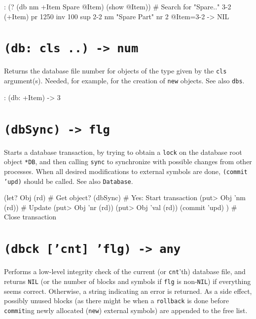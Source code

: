 {\begin{wideverbatim}
: (? (db nm +Item Spare @Item) (show @Item))  # Search for "Spare.."
{3-2} (+Item)
   pr 1250
   inv 100
   sup {2-2}
   nm "Spare Part"
   nr 2
 @Item={3-2}
-> NIL
\end{wideverbatim}

 
\section*{\texttt{(db: cls ..) -> num}}
\label{sec:func-ref-D-(db: cls ..) -> num}


Returns the database file number for objects of the type given by the
\texttt{cls} argument(s). Needed, for example, for the creation of \texttt{new}
objects. See also \texttt{dbs}.


\begin{wideverbatim}
: (db: +Item)
-> 3
\end{wideverbatim}

 
\section*{\texttt{(dbSync) -> flg}}
\label{sec:func-ref-D-(dbSync) -> flg}


Starts a database transaction, by trying to obtain a \texttt{lock} on the
database root object \texttt{*DB}, and then calling \texttt{sync} to synchronize with
possible changes from other processes. When all desired modifications to
external symbols are done, \texttt{(commit 'upd)} should be called. See also
\texttt{Database}.


\begin{wideverbatim}
(let? Obj (rd)             # Get object?
   (dbSync)                # Yes: Start transaction
   (put> Obj 'nm (rd))     # Update
   (put> Obj 'nr (rd))
   (put> Obj 'val (rd))
   (commit 'upd) )         # Close transaction
\end{wideverbatim}

 
\section*{\texttt{(dbck ['cnt] 'flg) -> any}}
\label{sec:func-ref-D-(dbck ['cnt] 'flg) -> any}


Performs a low-level integrity check of the current (or \texttt{cnt}'th)
database file, and returns \texttt{NIL} (or the number of blocks and symbols if
\texttt{flg} is non-\texttt{NIL}) if everything seems correct. Otherwise, a string
indicating an error is returned. As a side effect, possibly unused
blocks (as there might be when a \texttt{rollback} is done before \texttt{commit}ing newly allocated (\texttt{new}) external symbols) are appended to the free list.


}
